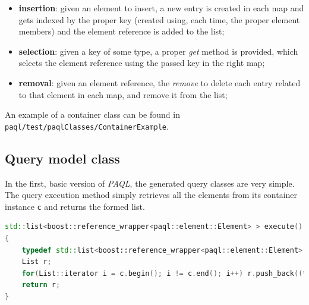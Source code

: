 \documentclass[10pt]{article}  %
\begin{document}
        \begin{itemize}
            \item \textbf{insertion}: given an element to insert, a new entry is created in each map and gets indexed by
            the proper key (created using, each time, the proper element members) and the element reference is added to the list;
            \item \textbf{selection}: given a key of some type, a proper \emph{get} method is provided,
            which selects the element reference using the passed key in the right map;
            \item \textbf{removal}: given an element reference, the \emph{remove} to delete each entry
            related to that element in each map, and remove it from the list;
        \end{itemize}
        An example of a container class can be found in \texttt{paql/test/paqlClasses/ContainerExample}.
    \subsection{Query model class}
        In the first, basic version of \emph{PAQL}, the generated query classes are very simple. The query execution
        method simply retrieves all the elements from its container instance \texttt{c} and returns the formed list.
        \begin{lstlisting}[language=C++]
std::list<boost::reference_wrapper<paql::element::Element> > execute()
{
    typedef std::list<boost::reference_wrapper<paql::element::Element> > List;
    List r;
    for(List::iterator i = c.begin(); i != c.end(); i++) r.push_back((*i));
    return r;
}
        \end{lstlisting}
\end{document}
